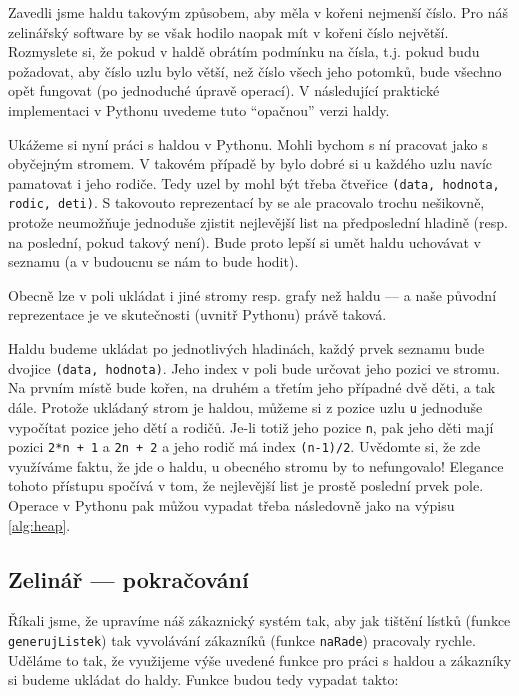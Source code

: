 Zavedli jsme haldu takovým způsobem, aby měla v kořeni nejmenší číslo. Pro náš zelinářský software by se však 
hodilo naopak mít v kořeni číslo největší. Rozmyslete si, že pokud v haldě obrátím podmínku na čísla, t.j. pokud budu požadovat,
aby číslo uzlu bylo větší, než číslo všech jeho potomků, bude všechno opět fungovat (po jednoduché úpravě operací). V následující
praktické implementaci v Pythonu uvedeme tuto ``opačnou'' verzi haldy.

Ukážeme si nyní práci s haldou v Pythonu. Mohli bychom s ní pracovat jako s obyčejným stromem. V takovém případě by bylo dobré si u každého
uzlu navíc pamatovat i jeho rodiče. Tedy uzel by mohl být třeba čtveřice {\tt (data, hodnota, rodic, deti)}. S takovouto reprezentací
by se ale pracovalo trochu nešikovně, protože neumožňuje jednoduše zjistit nejlevější list na předposlední hladině (resp. na poslední, pokud takový není).
Bude proto lepší si umět haldu uchovávat v seznamu (a v budoucnu se nám to bude hodit). 

\begin{todo}
Obecně lze v poli ukládat i jiné stromy resp. grafy než haldu --- a naše původní reprezentace je ve skutečnosti (uvnitř Pythonu)
právě taková.
\end{todo}

Haldu budeme ukládat po jednotlivých hladinách, každý prvek seznamu bude dvojice {\tt (data, hodnota)}. Jeho index v poli bude určovat jeho pozici ve stromu. 
Na prvním místě bude kořen, na druhém a třetím jeho případné dvě děti, a tak dále. Protože ukládaný strom je haldou, můžeme si z pozice uzlu {\tt u} jednoduše vypočítat
pozice jeho dětí a rodičů. Je-li totiž jeho pozice {\tt n}, pak jeho děti mají pozici {\tt 2*n + 1} a {\tt 2n + 2} a jeho rodič má index
{\tt (n-1)/2}. Uvědomte si, že zde využíváme faktu, že jde o haldu, u obecného stromu by to nefungovalo! Elegance tohoto přístupu spočívá v tom, 
že nejlevější list je prostě poslední prvek pole. Operace v Pythonu pak můžou vypadat třeba následovně jako na výpisu \ref{alg:heap}.



\subsection*{Zelinář --- pokračování} 

Říkali jsme, že upravíme náš zákaznický systém tak, aby jak tištění lístků (funkce {\tt generujListek}) tak vyvolávání zákazníků
(funkce {\tt naRade}) pracovaly rychle. Uděláme to tak, že využijeme výše uvedené funkce pro práci s haldou a zákazníky si budeme
ukládat do haldy. Funkce budou tedy vypadat takto:


